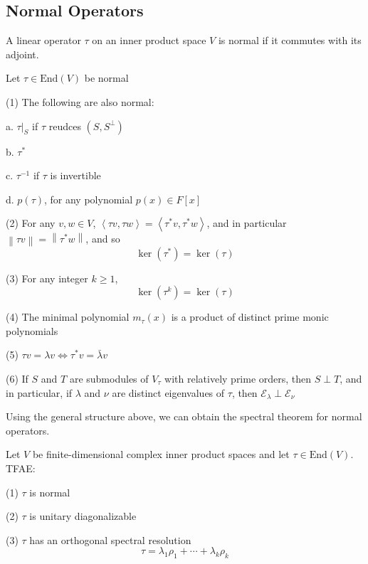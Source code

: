 \subsection{Normal Operators}
\begin{definition}
A linear operator $\tau$ on an inner product space $V$ is normal if it commutes with its adjoint.
\end{definition}
\begin{theorem}
Let $\tau\in \text{End}(V)$ be normal \par
(1) The following are also normal:\par

\quad a. $\tau|_S$ if $\tau$ reudces $(S,S^\perp)$\par
\quad b. $\tau^*$\par
\quad c. $\tau^{-1}$ if $\tau$ is invertible\par
\quad d. $p(\tau)$, for any polynomial $p(x)\in F[x]$\par

(2) For any $v,w\in V$, $\left \langle \tau v,\tau w \right \rangle =\left \langle \tau^* v,\tau^* w \right \rangle $, and in particular $\left \| \tau v \right \| =\left \| \tau^* w \right \| $, and so \[\ker(\tau^*)=\ker(\tau)\]\par
(3) For any integer $k\ge 1$, \[\ker(\tau^k)=\ker(\tau)\]\par
(4) The minimal polynomial $m_\tau(x)$ is a product of distinct prime monic polynomials\par
(5) $\tau v=\lambda v\Longleftrightarrow \tau^*v=\bar{\lambda}v$ \par
(6) If $S$ and $T$ are submodules of $V_\tau$ with relatively prime orders, then $S\perp T$, and in particular, if $\lambda$ and $\nu$ are distinct eigenvalues of $\tau$, then $\mathcal{E}_\lambda\perp \mathcal{E}_\nu$
\end{theorem}
Using the general structure above, we can obtain the spectral theorem for normal operators.
\begin{theorem}
Let $V$ be finite-dimensional complex inner product spaces and let $\tau\in \text{End}(V)$. TFAE:\par
(1) $\tau$ is normal\par
(2) $\tau$ is unitary diagonalizable\par
(3) $\tau$ has an orthogonal spectral resolution \[\tau=\lambda_1\rho_1+\cdots+\lambda_k\rho_k\]
\end{theorem}
\begin{theorem}

\end{theorem}
